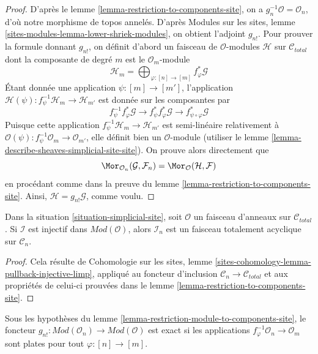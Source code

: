 \begin{proof}
D'après le lemme \ref{lemma-restriction-to-components-site}, on a
$g_n^{-1}\mathcal{O} = \mathcal{O}_n$, d'où notre
morphisme de topos annelés. D'après Modules sur les sites, lemme
\ref{sites-modules-lemma-lower-shriek-modules},
on obtient l'adjoint $g_{n!}$. Pour prouver la formule donnant $g_{n!}$,
on définit d'abord un faisceau de $\mathcal{O}$-modules $\mathcal{H}$
sur $\mathcal{C}_{total}$ dont la composante de degré $m$ est
le $\mathcal{O}_m$-module
$$
\mathcal{H}_m =
\bigoplus\nolimits_{\varphi : [n] \to [m]} f_\varphi^*\mathcal{G}
$$
Étant donnée une application $\psi : [m] \to [m']$, l'application
$\mathcal{H}(\psi) : f_\psi^{-1}\mathcal{H}_m \to \mathcal{H}_{m'}$
est donnée sur les composantes par
$$
f_\psi^{-1} f_\varphi^*\mathcal{G} \to
f_\psi^* f_\varphi^*\mathcal{G} \to
f_{\psi \circ \varphi}^*\mathcal{G}
$$
Puisque cette application $f_\psi^{-1}\mathcal{H}_m \to \mathcal{H}_{m'}$ est
semi-linéaire relativement à $\mathcal{O}(\psi) : f_\psi^{-1}\mathcal{O}_m \to \mathcal{O}_{m'}$,
elle définit bien un $\mathcal{O}$-module
(utiliser le lemme \ref{lemma-describe-sheaves-simplicial-site-site}).
On prouve alors directement que
$$
\Mor_{\mathcal{O}_n}(\mathcal{G}, \mathcal{F}_n) =
\Mor_{\mathcal{O}}(\mathcal{H}, \mathcal{F})
$$
en procédant comme dans la preuve du lemme \ref{lemma-restriction-to-components-site}.
Ainsi, $\mathcal{H} = g_{n!}\mathcal{G}$, comme voulu.
\end{proof}

\begin{lemma}
\label{lemma-restriction-injective-to-component-limp}
Dans la situation \ref{situation-simplicial-site},
soit $\mathcal{O}$ un faisceau d'anneaux sur $\mathcal{C}_{total}$.
Si $\mathcal{I}$ est injectif dans $\textit{Mod}(\mathcal{O})$, alors
$\mathcal{I}_n$ est un faisceau totalement acyclique sur $\mathcal{C}_n$.
\end{lemma}

\begin{proof}
Cela résulte de
Cohomologie sur les sites, lemme \ref{sites-cohomology-lemma-pullback-injective-limp},
appliqué au foncteur d'inclusion $\mathcal{C}_n \to \mathcal{C}_{total}$
et aux propriétés de celui-ci prouvées dans le lemme \ref{lemma-restriction-to-components-site}.
\end{proof}

\begin{lemma}
\label{lemma-exactness-g-shriek-modules}
Sous les hypothèses du
lemme \ref{lemma-restriction-module-to-components-site}, le foncteur
$g_{n!} : \textit{Mod}(\mathcal{O}_n) \to \textit{Mod}(\mathcal{O})$
est exact si les applications $f_\varphi^{-1}\mathcal{O}_n \to \mathcal{O}_m$
sont plates pour tout $\varphi : [n] \to [m]$.
\end{lemma}

